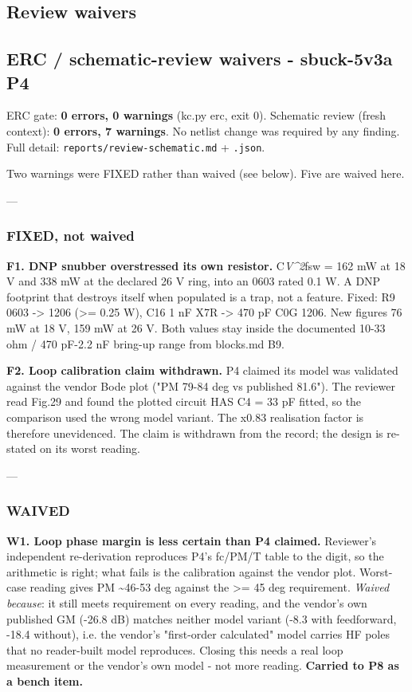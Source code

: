 \documentclass[11pt,a4paper]{article}
\begin{document}
\subsection*{Review waivers}
\subsection*{ERC / schematic-review waivers - sbuck-5v3a P4}
ERC gate: \textbf{0 errors, 0 warnings} (kc.py erc, exit 0). Schematic review (fresh context): \textbf{0 errors, 7 warnings}. No netlist change was required by any finding. Full detail: \texttt{reports/review-schematic.md} + \texttt{.json}.

Two warnings were FIXED rather than waived (see below). Five are waived here.

---

\subsubsection*{FIXED, not waived}
\textbf{F1. DNP snubber overstressed its own resistor.} C\emph{V\textasciicircum{}2}fsw = 162 mW at 18 V and 338 mW at the declared 26 V ring, into an 0603 rated 0.1 W. A DNP footprint that destroys itself when populated is a trap, not a feature. Fixed: R9 0603 -\textgreater{} 1206 (\textgreater{}= 0.25 W), C16 1 nF X7R -\textgreater{} 470 pF C0G 1206. New figures 76 mW at 18 V, 159 mW at 26 V. Both values stay inside the documented 10-33 ohm / 470 pF-2.2 nF bring-up range from blocks.md B9.

\textbf{F2. Loop calibration claim withdrawn.} P4 claimed its model was validated against the vendor Bode plot ("PM 79-84 deg vs published 81.6"). The reviewer read Fig.29 and found the plotted circuit HAS C4 = 33 pF fitted, so the comparison used the wrong model variant. The x0.83 realisation factor is therefore unevidenced. The claim is withdrawn from the record; the design is re-stated on its worst reading.

---

\subsubsection*{WAIVED}
\textbf{W1. Loop phase margin is less certain than P4 claimed.} Reviewer's independent re-derivation reproduces P4's fc/PM/\textbar{}T\textbar{} table to the digit, so the arithmetic is right; what fails is the calibration against the vendor plot. Worst-case reading gives PM \textasciitilde{}46-53 deg against the \textgreater{}= 45 deg requirement. \emph{Waived because}: it still meets requirement on every reading, and the vendor's own published GM (-26.8 dB) matches neither model variant (-8.3 with feedforward, -18.4 without), i.e. the vendor's "first-order calculated" model carries HF poles that no reader-built model reproduces. Closing this needs a real loop measurement or the vendor's own model - not more reading. \textbf{Carried to P8 as a bench item.}
\end{document}
